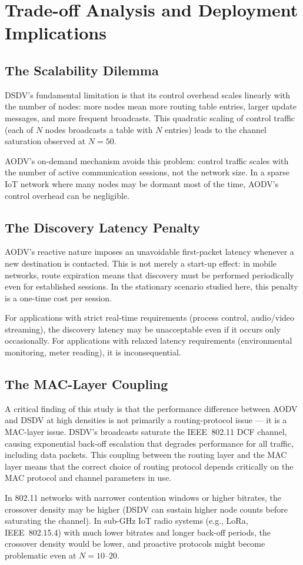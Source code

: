 \section{Trade-off Analysis and Deployment Implications}

\subsection{The Scalability Dilemma}

DSDV's fundamental limitation is that its control overhead scales linearly with the number
of nodes: more nodes mean more routing table entries, larger update messages, and more
frequent broadcasts. This quadratic scaling of control traffic (each of $N$ nodes
broadcasts a table with $N$ entries) leads to the channel saturation observed at $N = 50$.

AODV's on-demand mechanism avoids this problem: control traffic scales with the number
of active communication sessions, not the network size. In a sparse IoT network where
many nodes may be dormant most of the time, AODV's control overhead can be negligible.

\subsection{The Discovery Latency Penalty}

AODV's reactive nature imposes an unavoidable first-packet latency whenever a new
destination is contacted. This is not merely a start-up effect: in mobile networks,
route expiration means that discovery must be performed periodically even for established
sessions. In the stationary scenario studied here, this penalty is a one-time cost per
session.

For applications with strict real-time requirements (process control, audio/video
streaming), the discovery latency may be unacceptable even if it occurs only
occasionally. For applications with relaxed latency requirements (environmental
monitoring, meter reading), it is inconsequential.

\subsection{The MAC-Layer Coupling}

A critical finding of this study is that the performance difference between AODV and
DSDV at high densities is not primarily a routing-protocol issue --- it is a MAC-layer
issue. DSDV's broadcasts saturate the IEEE~802.11 DCF channel, causing exponential
back-off escalation that degrades performance for all traffic, including data packets.
This coupling between the routing layer and the MAC layer means that the correct choice
of routing protocol depends critically on the MAC protocol and channel parameters in use.

In 802.11 networks with narrower contention windows or higher bitrates, the crossover
density may be higher (DSDV can sustain higher node counts before saturating the
channel). In sub-GHz IoT radio systems (e.g., LoRa, IEEE~802.15.4) with much lower
bitrates and longer back-off periods, the crossover density would be lower, and proactive
protocols might become problematic even at $N = 10$--$20$.
